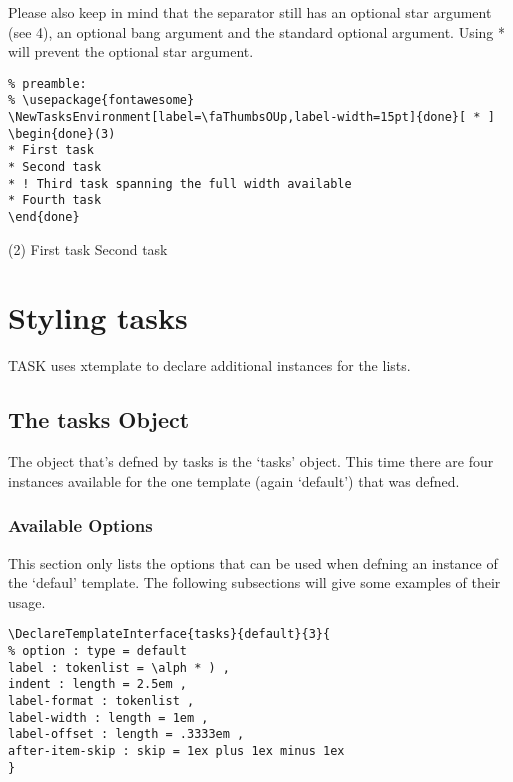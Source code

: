 \documentclass[a4paper,12pt,indent]{article}
\begin{document}
Please also keep in mind that the separator still has an optional star argument (see 4), an
optional bang argument and the standard optional argument. Using * will prevent the optional
star argument.

\begin{tcolorbox}[collower=black,colframe=Tasks,colback=white]
    \begin{lstlisting}
% preamble:
% \usepackage{fontawesome}
\NewTasksEnvironment[label=\faThumbsOUp,label-width=15pt]{done}[ * ]
\begin{done}(3)
* First task
* Second task
* ! Third task spanning the full width available
* Fourth task
\end{done}
\end{lstlisting}
        \tcblower
\begin{tasks}(2)
\task[$\nabla $] First task
\task[>>>>] Second task
\end{tasks}
           \end{tcolorbox}


\section{Styling tasks}

TASK uses xtemplate to declare additional instances for the lists.

\subsection{The tasks Object}

The object that’s defned by tasks is the `tasks' object. This time there are four instances
available for the one template (again `default') that was defned.

\subsubsection{Available Options}

This section only lists the options that can be used when defning an instance of the `defaul'
template. The following subsections will give some examples of their usage.

\begin{tcolorbox}[collower=black,colframe=Tasks,colback=white]
    \begin{lstlisting}
\DeclareTemplateInterface{tasks}{default}{3}{
% option : type = default
label : tokenlist = \alph * ) ,
indent : length = 2.5em ,
label-format : tokenlist ,
label-width : length = 1em ,
label-offset : length = .3333em ,
after-item-skip : skip = 1ex plus 1ex minus 1ex
}
\end{lstlisting}
    \end{tcolorbox}
\end{document}
